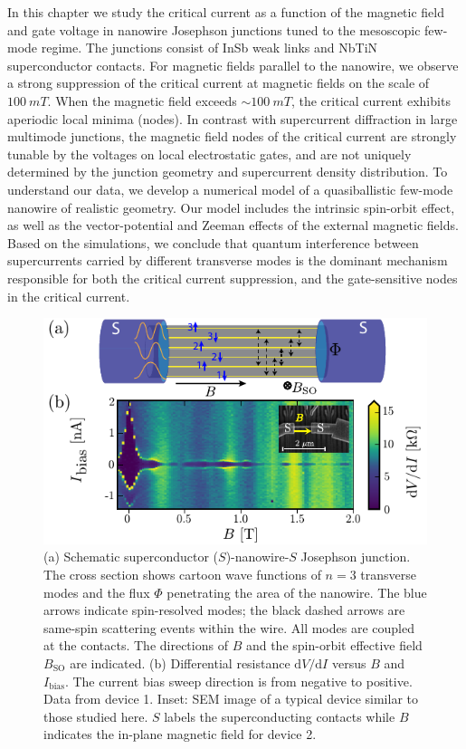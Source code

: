 In this chapter we study the critical current as a function of the magnetic field and gate voltage in nanowire Josephson junctions tuned to the mesoscopic few-mode regime.
The junctions consist of InSb weak links and NbTiN superconductor contacts.
For magnetic fields parallel to the nanowire, we observe a strong suppression of the critical current at magnetic fields on the scale of $\SI{100}{mT}$.
When the magnetic field exceeds $\sim \SI{100}{mT}$, the critical current exhibits aperiodic local minima (nodes).
In contrast with supercurrent diffraction in large multimode junctions, the magnetic field nodes of the critical current are strongly tunable by the voltages on local electrostatic gates, and are not uniquely determined by the junction geometry and supercurrent density distribution.
To understand our data, we develop a numerical model of a quasiballistic few-mode nanowire of realistic geometry.
Our model includes the intrinsic spin-orbit effect, as well as the vector-potential and Zeeman effects of the external magnetic fields.
Based on the simulations, we conclude that quantum interference between supercurrents carried by different transverse modes is the dominant mechanism responsible for both the critical current suppression, and the gate-sensitive nodes in the critical current.

\begin{figure}
\begin{center}
\includegraphics[width=0.7\columnwidth]{chapter_supercurrent/figures/fig1.pdf}
\caption{(a) Schematic superconductor ($S$)-nanowire-$S$ Josephson junction.
The cross section shows cartoon wave functions of $n=3$ transverse modes and the flux $\Phi$ penetrating the area of the nanowire.
The blue arrows indicate spin-resolved modes; the black dashed arrows are same-spin scattering events within the wire.
All modes are coupled at the contacts.
The directions of $B$ and the spin-orbit effective field $B_\mathrm{SO}$ are indicated.
(b) Differential resistance $\mathrm{d}V/\mathrm{d}I$ versus $B$ and $I_\mathrm{bias}$.
The current bias sweep direction is from negative to positive.
Data from device 1.
Inset: SEM image of a typical device similar to those studied here.
$S$ labels the superconducting contacts while $B$ indicates the in-plane magnetic field for device 2.}
\label{fig:figure1}
\end{center}
\end{figure}

